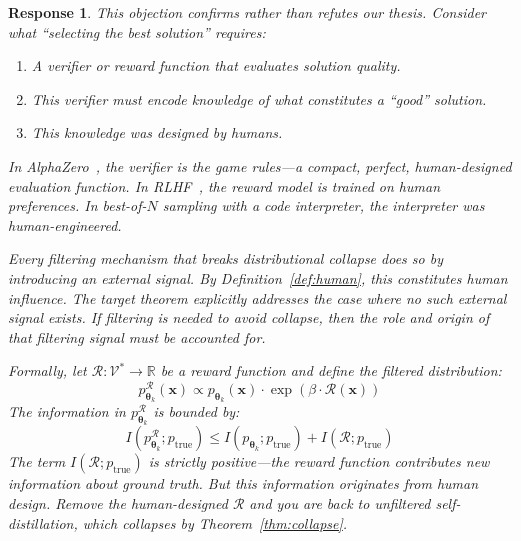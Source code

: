 \documentclass[11pt,a4paper]{article}
\newtheorem{response}{Response}
\begin{document}
\begin{response}
This objection confirms rather than refutes our thesis. Consider what ``selecting the best solution'' requires:
\begin{enumerate}
    \item A \emph{verifier} or \emph{reward function} that evaluates solution quality.
    \item This verifier must encode knowledge of what constitutes a ``good'' solution.
    \item This knowledge was designed by humans.
\end{enumerate}
In AlphaZero~\cite{silver2017alphazero}, the verifier is the game rules---a compact, perfect, human-designed evaluation function. In RLHF~\cite{ouyang2022rlhf}, the reward model is trained on human preferences. In best-of-$N$ sampling with a code interpreter, the interpreter was human-engineered.

Every filtering mechanism that breaks distributional collapse does so by introducing an external signal. By Definition~\ref{def:human}, this constitutes human influence. The target theorem explicitly addresses the case where no such external signal exists. If filtering is needed to avoid collapse, then the role and origin of that filtering signal must be accounted for.

Formally, let $\mathcal{R}: \mathcal{V}^* \to \mathbb{R}$ be a reward function and define the filtered distribution:
\begin{equation}
p_{\bm{\theta}_k}^{\mathcal{R}}(\bm{x}) \propto p_{\bm{\theta}_k}(\bm{x}) \cdot \exp(\beta \cdot \mathcal{R}(\bm{x}))
\end{equation}
The information in $p_{\bm{\theta}_k}^{\mathcal{R}}$ is bounded by:
\begin{equation}
I(p_{\bm{\theta}_k}^{\mathcal{R}}; p_{\mathrm{true}}) \leq I(p_{\bm{\theta}_k}; p_{\mathrm{true}}) + I(\mathcal{R}; p_{\mathrm{true}})
\end{equation}
The term $I(\mathcal{R}; p_{\mathrm{true}})$ is strictly positive---the reward function contributes new information about ground truth. But this information originates from human design. Remove the human-designed $\mathcal{R}$ and you are back to unfiltered self-distillation, which collapses by Theorem~\ref{thm:collapse}.


\end{response}
\end{document}
